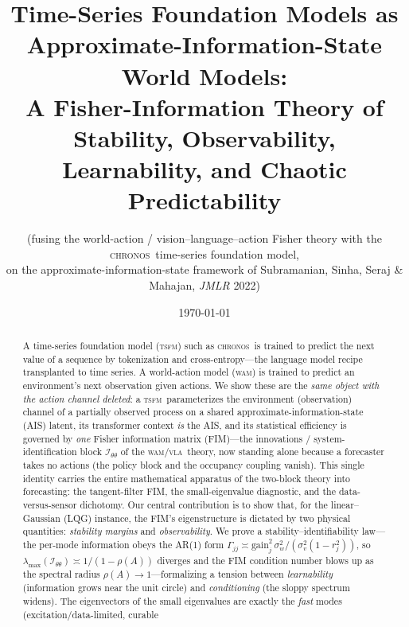 \documentclass[10pt]{article}
\theoremstyle{plain}
\theoremstyle{definition}
\theoremstyle{remark}
\newcommand{\Fisher}{\mathcal{I}}
\newcommand{\Ith}{\Fisher_{\theta\theta}}
\newcommand{\TSFM}{\textsc{tsfm}}
\newcommand{\WAM}{\textsc{wam}}
\newcommand{\VLA}{\textsc{vla}}
\newcommand{\Chronos}{\textsc{chronos}}
\begin{document}
\title{\bfseries Time-Series Foundation Models as
Approximate-Information-State World Models:\\[3pt]
\large A Fisher-Information Theory of Stability, Observability, Learnability,
and Chaotic Predictability}
\author{\normalsize (fusing the world-action / vision--language--action Fisher
theory with the \Chronos\ time-series foundation model,\\[-1pt]
\normalsize on the approximate-information-state framework of Subramanian,
Sinha, Seraj \& Mahajan, {\itshape JMLR} 2022)}
\date{\today}
\maketitle
\thispagestyle{plain}

\begin{abstract}\noindent
A time-series foundation model (\TSFM) such as \Chronos\ is trained to predict
the next value of a sequence by tokenization and cross-entropy---the language
model recipe transplanted to time series. A world-action model (\WAM) is trained
to predict an environment's next observation given actions. We show these are
the \emph{same object with the action channel deleted}: a \TSFM\ parameterizes
the environment (observation) channel of a partially observed process on a
shared approximate-information-state (AIS) latent, its transformer context
\emph{is} the AIS, and its statistical efficiency is governed by \emph{one}
Fisher information matrix (FIM)---the innovations / system-identification block
$\Ith$ of the \WAM/\VLA\ theory, now standing alone because a forecaster takes
no actions (the policy block and the occupancy coupling vanish). This single
identity carries the entire mathematical apparatus of the two-block theory into
forecasting: the tangent-filter FIM, the small-eigenvalue diagnostic, and the
data-versus-sensor dichotomy. Our central contribution is to show that, for the
linear--Gaussian (LQG) instance, the FIM's eigenstructure is dictated by two
physical quantities: \emph{stability margins} and \emph{observability}. We prove
a stability--identifiability law---the per-mode information obeys the AR(1) form
$\Gamma_{jj}\asymp \mathrm{gain}_j^2\,\sigma_w^2/(\sigma_v^2(1-r_j^2))$, so
$\lambda_{\max}(\Ith)\asymp 1/(1-\rho(A))$ diverges and the FIM condition number
blows up as the spectral radius $\rho(A)\to 1$---formalizing a tension between
\emph{learnability} (information grows near the unit circle) and
\emph{conditioning} (the sloppy spectrum widens). The eigenvectors of the small
eigenvalues are exactly the \emph{fast} modes (excitation/data-limited, curable

\end{abstract}
\end{document}
